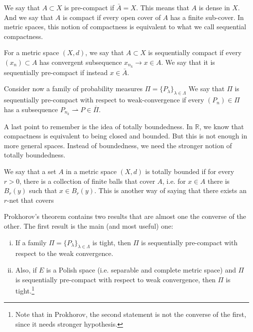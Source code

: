 \begin{shaded}
	\begin{note}
		We say that $A \subset X$ is pre-compact
		if $\bar A = X$. This means that $A$
		is dense in $X$. And we say that $A$ is compact
		if every open cover of $A$ has a finite sub-cover.
		In metric spaces, this notion of compactness is
		equivalent to what we call sequential compactness.

		For a metric space $(X,d)$, we say that
		$A \subset X$ is sequentially compact if
		every $(x_n) \subset A$ has convergent
		subsequence $x_{n_k} \to x \in A$. We say that
		it is sequentially pre-compact if instead $x \in \bar A$.

		Consider now a family of probability
		measures $\Pi = \{P_\lambda \}_{\lambda \in \Lambda}$
		We say that $\Pi$ is sequentially pre-compact with
		respect to weak-convergence
		if every $(P_n) \in \Pi$ has a subsequence
		$P_{n_k} \rightharpoonup P \in \overline \Pi$.

		A last point to remember is the idea of totally boundedness.
		In $\mathbb R$, we know that compactness
		is equivalent to being closed and bounded. But this is
		not enough in more general spaces. Instead of boundedness,
		we need the stronger notion of totally boundedness.

		We say that a set $A$ in a metric space $(X,d)$ is totally bounded
		if for every $r > 0$, there is a collection of finite
		balls that cover $A$, i.e. for $x \in A$ there is $B_r(y)$
		such that $x \in B_r(y)$. This is another way of saying
		that there exists an $r$-net that covers
	\end{note}
\end{shaded}

\begin{theorem}[Prokhorov]
  Prokhorov's theorem contains two results that are almost one the converse of the other. 
  The first result is the main (and most useful) one:
  \begin{enumerate}[(i)]
    \item If a family $\Pi = \{P_\lambda \}_{\lambda \in \Lambda}$
	is tight, then
	$\Pi$ is sequentially pre-compact with respect to the weak convergence.
    \item Also, if $E$ is a Polish space (i.e. separable and complete metric space)
	and $\Pi$ is sequentially pre-compact with respect to weak convergence, then $\Pi$ is tight.\footnote{Note that in Prokhorov, the second
		statement is not the converse of the first, since it needs stronger hypothesis.}
  \end{enumerate}

	\label{thm:prokhorov}
\end{theorem}


